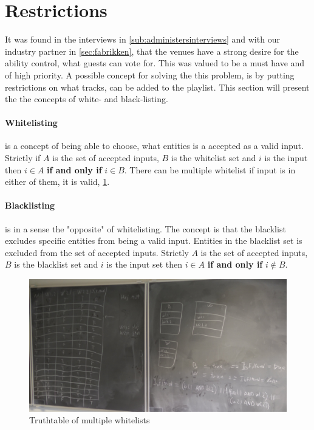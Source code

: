 \section{Restrictions}
\label{sec:restrictions}

It was found in the interviews in \cref{sub:administersinterviews} and with our industry partner in \cref{sec:fabrikken}, that the venues have a strong desire for the ability control, what guests can vote for. This was valued to be a must have and of high priority. A possible concept for solving the this problem, is by putting restrictions on what tracks, can be added to the playlist. This section will present the the concepts of white- and black-listing.

\paragraph{Whitelisting} is a concept of being able to choose, what entities is a accepted as a valid input. Strictly if $A$ is the set of accepted inputs, $B$ is the whitelist set and $i$ is the input then $i \in A$ \textbf{if and only if} $i \in B$. There can be multiple whitelist if input is in either of them, it is valid, \cref{fig:restrictions}.

\paragraph{Blacklisting} is in a sense the "opposite" of whitelisting. The concept is that the blacklist excludes specific entities from being a valid input. Entities in the blacklist set is excluded from the set of accepted inputs. Strictly $A$ is the set of accepted inputs, $B$ is the blacklist set and $i$ is the input set then $i \in A$ \textbf{if and only if} $i \notin B$.


\begin{figure}[H]
  \centering
  \includegraphics[width=1.2\linewidth]{Images/restriction.jpg}
  \caption{Truthtable of multiple whitelists}\label{fig:restrictions}
\end{figure}

